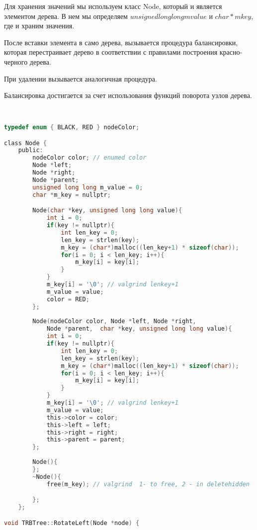 Для хранения значений мы используем класс Node, который и является элементом дерева. В нем мы определяем $unsigned long long mvalue$  и $char *mkey$, где и храним значения.

После вставки элемента в само дерева, вызывается процедура балансировки, которая перестраивает дерево в соответствии с правилами построения красно-черного дерева.

При удалении вызывается аналогичная процедура. 

Балансировка достигается за счет использования функций поворота узлов дерева.


\begin{lstlisting}[language=C]


typedef enum { BLACK, RED } nodeColor;

class Node {
    public:
        nodeColor color; // enumed color
        Node *left;
        Node *right;
        Node *parent;
        unsigned long long m_value = 0;
        char *m_key = nullptr;

        Node(char *key, unsigned long long value){
            int i = 0;
            if(key != nullptr){
                int len_key = 0;
                len_key = strlen(key);
                m_key = (char*)malloc((len_key+1) * sizeof(char));
                for(i = 0; i < len_key; i++){
                    m_key[i] = key[i];
                }
            }
            m_key[i] = '\0'; // valgrind lenkey+1        
            m_value = value;
            color = RED;
        };
        
        Node(nodeColor color, Node *left, Node *right, 
            Node *parent,  char *key, unsigned long long value){
            int i = 0;
            if(key != nullptr){
                int len_key = 0;
                len_key = strlen(key);
                m_key = (char*)malloc((len_key+1) * sizeof(char));
                for(i = 0; i < len_key; i++){
                    m_key[i] = key[i];
                }
            }
            m_key[i] = '\0'; // valgrind lenkey+1        
            m_value = value;
            this->color = color;
            this->left = left;
            this->right = right;
            this->parent = parent;
        };
        
        Node(){ 
        };
        ~Node(){
            free(m_key); // valgrind  1- to free, 2 - in deletehidden

        };
    };

void TRBTree::RotateLeft(Node *node) {


\end{lstlisting}
